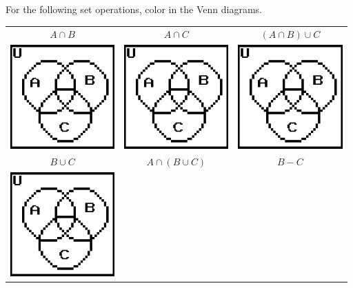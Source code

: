 \documentclass[a4paper,12pt]{book}
\newcounter{question}
\begin{document}
        \begin{questionNOGRADE}{\thequestion}

            For the following set operations, color in the Venn diagrams.

            \begin{center}
                \begin{tabular}{c c c}
                    $A \cap B$ &
                    $A \cap C$ &
                    $(A \cap B) \cup C$
                    \\
                    \includegraphics[width=4cm]{images/venndiagram.png} &
                    \includegraphics[width=4cm]{images/venndiagram.png} &
                    \includegraphics[width=4cm]{images/venndiagram.png}
                    \\
                    $B \cup C$ &
                    $A \cap (B \cup C)$ &
                    $B - C$
                    \\
                    \includegraphics[width=4cm]{images/venndiagram.png} &

\end{tabular}
\end{center}
\end{questionNOGRADE}
\end{document}
